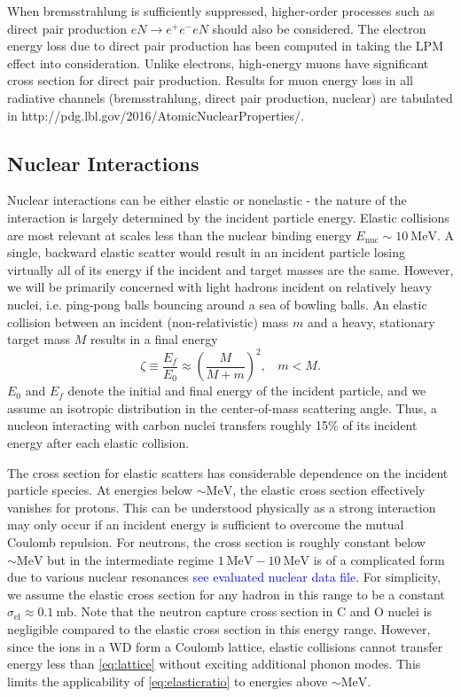 \documentclass[twocolumn,showpacs,preprintnumbers,amsmath,amssymb,prd]{revtex4}
\def\r{\right)}
\def\l{\left(}
\begin{document}
\begin{appendices}
When bremsstrahlung is sufficiently suppressed, higher-order processes such as direct pair production $e N \rightarrow e^+ e^- e N$ should also be considered. The electron energy loss due to direct pair production has been computed in \cite{Klein} taking the LPM effect into consideration. Unlike electrons, high-energy muons have significant cross section for direct pair production. Results for muon energy loss in all radiative channels (bremsstrahlung, direct pair production, nuclear) are tabulated in http://pdg.lbl.gov/2016/AtomicNuclearProperties/. 
 
\subsection*{Nuclear Interactions}
Nuclear interactions can be either elastic or nonelastic - the nature of the interaction is largely determined by the incident particle energy. Elastic collisions are most relevant at scales less than the nuclear binding energy $E_\text{nuc} \sim 10 ~\text{MeV}$. A single, backward elastic scatter would result in an incident particle losing virtually all of its energy if the incident and target masses are the same. However, we will be primarily concerned with light hadrons incident on relatively heavy nuclei, i.e. ping-pong balls bouncing around a sea of bowling balls.
An elastic collision between an incident (non-relativistic) mass $m$ and a heavy, stationary target mass $M$ results in a final energy
\begin{equation}
\label{eq:elasticratio}
\zeta \equiv \frac{E_f}{E_0} \approx \l \frac{M}{M+m} \r^2, ~~~~ m < M.
\end{equation}
$E_0$ and $E_f$ denote the initial and final energy of the incident particle, and we assume an isotropic distribution in the center-of-mass scattering angle. Thus, a nucleon interacting with carbon nuclei transfers roughly 15\% of its incident energy after each elastic collision.

The cross section for elastic scatters has considerable dependence on the incident particle species. At energies below $\sim \text{MeV}$, the elastic cross section effectively vanishes for  protons. This can be understood physically as a strong interaction may only occur if an incident energy is sufficient to overcome the mutual Coulomb repulsion. For neutrons, the cross section is roughly constant below $\sim \text{MeV}$ but in the intermediate regime $1 ~\text{MeV} - \text{10} ~\text{MeV}$ is of a complicated form due to various nuclear resonances \textcolor{blue}{see evaluated nuclear data file}. For simplicity, we assume the elastic cross section for any hadron in this range to be a constant $\sigma_\text{el} \approx 0.1 ~\text{mb}$. Note that the neutron capture cross section in C and O nuclei is negligible compared to the elastic cross section in this energy range. However, since the ions in a WD form a Coulomb lattice, elastic collisions cannot transfer energy less than \eqref{eq:lattice} without exciting additional phonon modes. This limits the applicability of \eqref{eq:elasticratio} to energies above $\sim \text{MeV}$.


\end{appendices}
\end{document}

